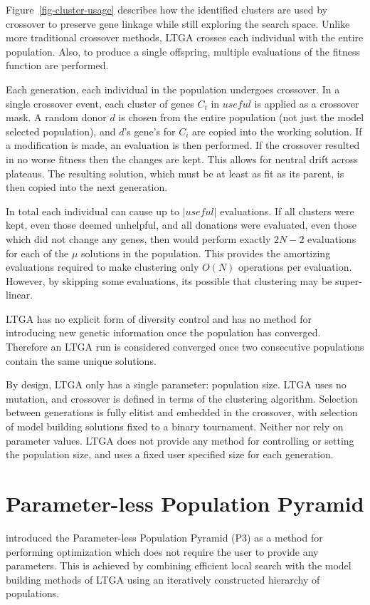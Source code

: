 \documentclass[twoside]{article}
\begin{document}
Figure~\ref{fig-cluster-usage} describes how the identified clusters are used by crossover to preserve
gene linkage while still exploring the search space. Unlike more traditional crossover methods, LTGA
crosses each individual with the entire population. Also, to produce a single offspring, multiple evaluations
of the fitness function are performed.

Each generation, each individual in the population undergoes crossover. In a single crossover event, each
cluster of genes $C_i$ in $useful$ is applied as a crossover mask. A random donor $d$
is chosen from the entire population (not just the model selected population), and $d$'s gene's for $C_i$ are copied
into the working solution. If a modification is made, an evaluation is then performed. If the crossover
resulted in no worse fitness then the changes are kept. This allows for neutral drift across plateaus.
The resulting solution, which must be at least as fit as its parent, is then
copied into the next generation.


In total each individual can cause up to $|useful|$ evaluations. If all clusters were kept, even those deemed
unhelpful, and all donations were evaluated, even those which did not change any genes, then 
would perform exactly $2N-2$ evaluations for each of the $\mu$ solutions in the population. This provides the amortizing evaluations
required to make clustering only $O(N)$ operations per evaluation. However, by skipping some evaluations, its
possible that clustering may be super-linear.

LTGA has no explicit form of diversity control and has no method for introducing new genetic information once
the population has converged. Therefore an LTGA run is considered converged once two consecutive populations
contain the same unique solutions.

By design, LTGA only has a single parameter: population size. LTGA uses no mutation, and crossover is defined
in terms of the clustering algorithm. Selection between generations is fully elitist and embedded in the crossover,
with selection of model building solutions fixed to a binary tournament. Neither  nor
 rely on parameter values. LTGA does not provide any method for controlling or setting
the population size, and uses a fixed user specified size for each generation.

\section{Parameter-less Population Pyramid}
\label{sec-p3}
\cite{goldman:2014:p3} introduced the Parameter-less Population Pyramid (P3) as a method for
performing optimization which does not require the user to provide any parameters. This is
achieved by combining efficient local search with the model building methods of LTGA using
an iteratively constructed hierarchy of populations.
\end{document}
